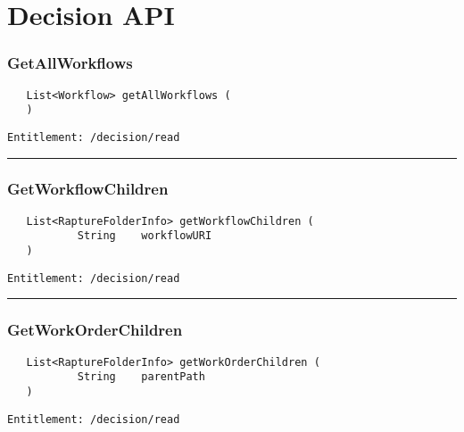 \chapter{Decision API}

\subsection{GetAllWorkflows}
\label{Api:GetAllWorkflows}
\begin{Verbatim}
   List<Workflow> getAllWorkflows (
   )
\end{Verbatim}
\begin{Verbatim}[formatcom=\color{Maroon}]
  Entitlement: /decision/read
\end{Verbatim}



\rule{12cm}{2pt}
\subsection{GetWorkflowChildren}
\label{Api:GetWorkflowChildren}
\begin{Verbatim}
   List<RaptureFolderInfo> getWorkflowChildren (
           String    workflowURI
   )
\end{Verbatim}
\begin{Verbatim}[formatcom=\color{Maroon}]
  Entitlement: /decision/read
\end{Verbatim}



\rule{12cm}{2pt}
\subsection{GetWorkOrderChildren}
\label{Api:GetWorkOrderChildren}
\begin{Verbatim}
   List<RaptureFolderInfo> getWorkOrderChildren (
           String    parentPath
   )
\end{Verbatim}
\begin{Verbatim}[formatcom=\color{Maroon}]
  Entitlement: /decision/read
\end{Verbatim}




